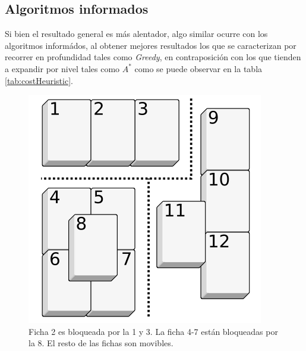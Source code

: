 \documentclass{sig-alternate}
\begin{document}
\subsection*{Algoritmos informados}
Si bien el resultado general es m\'as alentador, algo similar ocurre con los algoritmos inform\'ados, al obtener mejores resultados los que se caracterizan por recorrer en profundidad tales como \emph{Greedy}, en contraposici\'on con los que tienden a expandir por nivel tales como \emph{$A^*$} como se puede observar en la tabla \ref{tab:costHeuristic}.

\onecolumn

\begin{figure}[h!]
  \begin{center}
  	\includegraphics[scale=0.3]{images/blocking.png}
  \end{center}
  \caption{Ficha 2 es bloqueada por la 1 y 3. La ficha 4-7 est\'an bloqueadas por la 8. El resto de las fichas son movibles.}
  \label{fig:blocking}
\end{figure}
\end{document}
